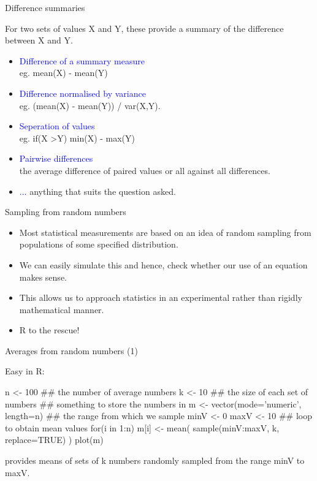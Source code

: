 \documentclass[pdf]{beamer}
\begin{document}
\begin{frame}{Difference summaries}

For two sets of values X and Y, these provide a summary of the difference
between X and Y.

\begin{itemize}
\item \textcolor{blue}{Difference of a summary measure}\\ eg. mean(X) - mean(Y)
\item \textcolor{blue}{Difference normalised by variance}\\ eg. (mean(X) -
  mean(Y)) / var(X,Y).
\item \textcolor{blue}{Seperation of values}\\ eg. if(X \textgreater Y) min(X) - max(Y)
\item \textcolor{blue}{Pairwise differences}\\ the average difference of
  paired values or all against all differences.
\item \textcolor{blue}{...} anything that suits the question asked.
\end{itemize}

\end{frame}

\begin{frame}{Sampling from random numbers}
  \begin{itemize}
  \item  Most statistical measurements are based on an idea of random sampling from
    populations of some specified distribution.
  \item We can easily simulate this and hence, check whether our use of an equation
    makes sense.
  \item This allows us to approach statistics in an experimental rather
    than rigidly mathematical manner.
  \item R to the rescue!
  \end{itemize}
\end{frame}

\begin{frame}[fragile]{Averages from random numbers (1)}

Easy in R:
\begin{rcode}
  n <- 100 ## the number of average numbers
  k <- 10  ## the size of each set of numbers
  ## something to store the numbers in
  m <- vector(mode='numeric', length=n) 
  ## the range from which we sample 
  minV <- 0
  maxV <- 10 
  ## loop to obtain mean values
  for(i in 1:n){
    m[i] <- mean( sample(minV:maxV, k, replace=TRUE) )
  }
  plot(m)
\end{rcode}

provides means of sets of k numbers randomly sampled from the range minV to maxV.

\end{frame}
\end{document}
